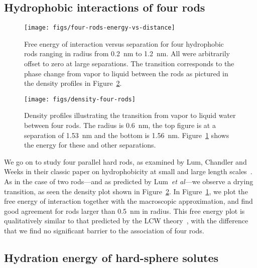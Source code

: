 \documentclass[twocolumn,amsmath,amssymb,prb]{revtex4-1}
\begin{document}
\subsection{Hydrophobic interactions of four rods}

\begin{figure}
\begin{center}
\texttt{[image: figs/four-rods-energy-vs-distance]}
\end{center}
\caption{ Free energy of interaction
versus separation for four hydrophobic rods ranging in radius from
0.2~nm to 1.2~nm.
All were arbitrarily offset to zero at large separations. The
transition corresponds to the phase change from
vapor to liquid between the rods as pictured in the density profiles in 
Figure~\ref{fig:density-four-rods}. }
\label{fig:four-rods-energy-vs-distance}
\end{figure}

\begin{figure}
\begin{center}
\texttt{[image: figs/density-four-rods]}
\end{center}
\caption{ Density profiles illustrating the transition from vapor 
to liquid water between four rods. The radius is 0.6~nm, the top figure is
at a separation of 1.53~nm and the
bottom is 1.56~nm. Figure~\ref{fig:four-rods-energy-vs-distance} shows
the energy for these and other separations.}
\label{fig:density-four-rods}
\end{figure}

We go on to study four parallel hard rods, as examined by Lum,
Chandler and Weeks in their classic paper on hydrophobicity at small
and large length scales~\cite{lum1999hydrophobicity}.  As in the case
of two rods---and as predicted by Lum~\emph{et al}---we observe a
drying transition, as seen the density plot shown in
Figure~\ref{fig:density-four-rods}.  In
Figure~\ref{fig:four-rods-energy-vs-distance}, we plot the free energy
of interaction together with the macroscopic approximation, and find
good agreement for rods larger than 0.5~nm in radius.  This free
energy plot is qualitatively similar to that predicted by the LCW
theory~\cite{lum1999hydrophobicity}, with the difference that we find
no significant barrier to the association of four rods.


\subsection{Hydration energy of hard-sphere solutes}
\end{document}
